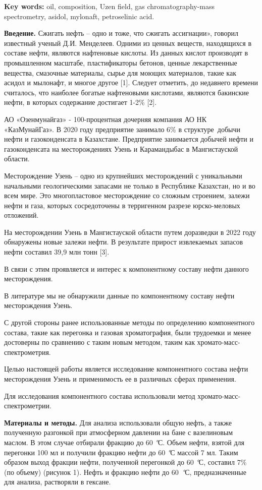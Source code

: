 {\bfseries Key words:} oil, composition, Uzen field, gas
chromatography-mass spectrometry, asidol, mylonaft, petroselinic acid.

\begin{multicols}{2}
{\bfseries Введение.} Сжигать нефть -- одно и тоже, что сжигать
ассигнации», говорил известный ученый Д.И. Менделеев. Одними из ценных
веществ, находящихся в составе нефти, являются нафтеновые кислоты. Из
данных кислот производят в промышленном масштабе, пластификаторы
бетонов, ценные лекарственные вещества, смазочные материалы, сырье для
моющих материалов, такие как асидол и мылонафт, и многое другое {[}1{]}.
Следует отметить, до недавнего времени считалось, что наиболее богатые
нафтеновыми кислотами, являются бакинские нефти, в которых содержание
достигает 1-2\% {[}2{]}.

АО «Озенмунайгаз» - 100-процентная дочерняя компания АО НК
«КазМунайГаз». В 2020 году предприятие занимало 6\% в структуре~добычи
нефти и газоконденсата в Казахстане. Предприятие занимается добычей
нефти и газоконденсата на месторождениях Узень и Карамандыбас в
Мангистауской области.

Месторождение Узень -- одно из крупнейших месторождений с уникальными
начальными геологическими запасами не только в Республике Казахстан, но
и во всем мире. Это многопластовое месторождение со сложным строением,
залежи нефти и газа, которых сосредоточены в терригенном разрезе
юрско-меловых отложений.

На месторождении Узень в Мангистауской области путем доразведки в 2022
году обнаружены новые залежи нефти. В результате прирост извлекаемых
запасов нефти составил 39,9 млн тонн {[}3{]}.

В связи с этим проявляется и интерес к компонентному составу нефти
данного месторождения.

В литературе мы не обнаружили данные по компонентному составу нефти
месторождения Узень.

С другой стороны ранее использованные методы по определению
компонентного состава, такие как перегонка и газовая хроматография, были
трудоемки и менее достоверны по сравнению с таким новым методом, таким
как хромато-масс-спектрометрия.

Целью настоящей работы является исследование компонентного состава нефти
месторождения Узень и применимость ее в различных сферах применения.

Для исследования компонентного состава использовали метод
хромато-масс-спектрометрии.

{\bfseries Материалы и методы.} Для анализа использовали общую нефть, а
также полученную разгонкой при атмосферном давлении на бане с
вазелиновым маслом. В этом случае отбирали фракцию до 60 \emph{°}С.
Объем нефти, взятой для перегонки 100 мл и получили фракцию нефти до 60
\emph{°}С массой 7 мл. Таким образом выход фракции нефти, полученной
перегонкой до 60 \emph{°}С, составил 7\% (по объему) (рисунок 1). Нефть
и фракцию нефти до 60~\emph{°}С, предназначенные для анализа, растворяли
в гексане.


\end{multicols}
